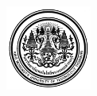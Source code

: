 \documentclass[12pt,oneside,openright,a4paper]{cpe-thai-project}
\begin{document}
\pdfstringdefDisableCommands{%
	\let\MakeUppercase\relax
}

\begin{center}
	\includegraphics[width=2.8cm]{logo02.jpg}
\end{center}
\vspace*{-1cm}

\maketitlepage
\makesignaturepage








\tableofcontents
\listoftables
\listoffigures
\end{document}
